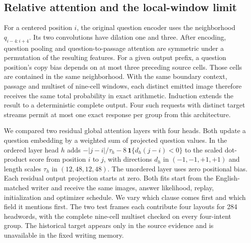 \subsection*{Relative attention and the local-window limit}
For a centered position $i$, the original question encoder uses the neighborhood $q_{i-4:i+4}$. Its two convolutions have dilation one and three. After encoding, question pooling and question-to-passage attention are symmetric under a permutation of the resulting features. For a given output prefix, a question position's copy bias depends on at most three preceding source cells. Those cells are contained in the same neighborhood. With the same boundary context, passage and multiset of nine-cell windows, each distinct emitted image therefore receives the same total probability in exact arithmetic. Induction extends the result to a deterministic complete output. Four such requests with distinct target streams permit at most one exact response per group from this architecture.

We compared two residual global attention layers with four heads. Both update a question embedding by a weighted sum of projected question values. In the ordered layer head $h$ adds $-|j-i|/\tau_h-8\,\mathbf{1}\{d_h(j-i)<0\}$ to the scaled dot-product score from position $i$ to $j$, with directions $d_h$ in $(-1,-1,+1,+1)$ and length scales $\tau_h$ in $(12,48,12,48)$. The unordered layer uses zero positional bias. Each residual output projection starts at zero. Both fits start from the English-matched writer and receive the same images, answer likelihood, replay, initialization and optimizer schedule. We vary which clause comes first and which field it mentions first. The two test frames each contribute four layouts for 284 headwords, with the complete nine-cell multiset checked on every four-intent group. The historical target appears only in the source evidence and is unavailable in the fixed writing memory.
